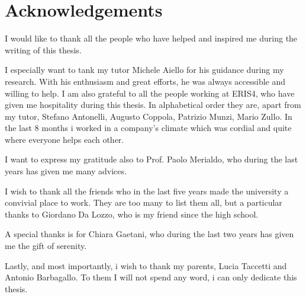\chapter{Acknowledgements}
I would like to thank all the people who have helped and inspired me during the writing of this thesis.

I especially want to tank my tutor Michele Aiello for his guidance during my research. With his enthusiasm and great efforts, he was always accessible and willing to help. I am also grateful to all the people working at ERIS4, who have given me hospitality during this thesis. In alphabetical order they are, apart from my tutor, Stefano Antonelli, Augusto Coppola, Patrizio Munzi, Mario Zullo. In the last 8 months i worked in a company's climate which was cordial and quite where everyone helps each other.

I want to express my gratitude also to Prof. Paolo Merialdo, who during the last years has given me many advices.

I wish to thank all the friends who in the last five years made the university a convivial place to work. They are too many to list them all, but a particular thanks to Giordano Da Lozzo, who is my friend since the high school.

A special thanks is for Chiara Gaetani, who during the last two years has given me the gift of serenity.

Lastly, and most importantly, i wish to thank my parents, Lucia Taccetti and Antonio Barbagallo. To them I will not spend any word, i can only dedicate this thesis.

